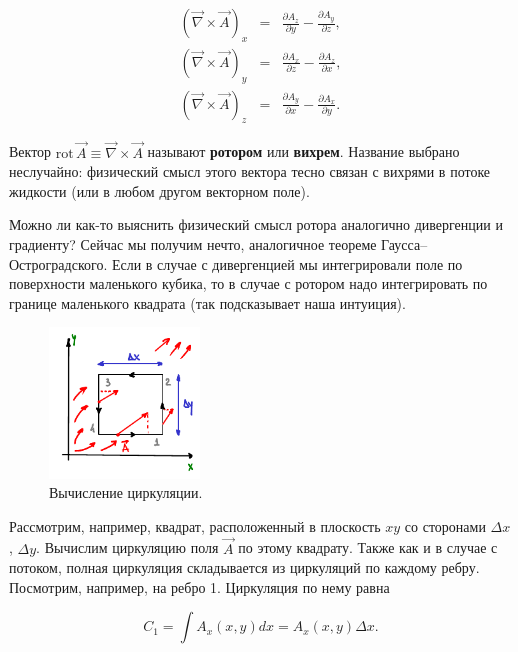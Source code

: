 \documentclass[12pt,a4paper]{article}
\numberwithin{equation}{section}
\numberwithin{equation}{section}
\newcommand{\nn}{\nonumber}
\newcommand{\pt}{\partial}
\newcommand{\rot}{\mathrm{rot}\,}
\newcommand{\vn}{\vec{\nabla}}
\begin{document}
\begin{eqnarray}
  \label{eq:def_curl}
  \nn
  (\vec{\nabla} \times \vec{A})_x &=& \frac{\pt A_z}{\pt y} -  \frac{\pt
    A_y}{\pt z},\\
  (\vec{\nabla} \times \vec{A})_y &=& \frac{\pt A_x}{\pt z} -  \frac{\pt
    A_z}{\pt x},\\
  \nn
  (\vec{\nabla} \times \vec{A})_z &=& \frac{\pt A_y}{\pt x} -  \frac{\pt
    A_x}{\pt y}.
\end{eqnarray}

Вектор $\rot \vec{A} \equiv \vn \times \vec{A}$ называют
\textbf{ротором} или \textbf{вихрем}. Название выбрано неслучайно:
физический смысл этого вектора тесно связан с вихрями в потоке
жидкости (или в любом другом векторном поле).

Можно ли как-то выяснить физический смысл ротора аналогично
дивергенции и градиенту? Сейчас мы получим нечто, аналогичное теореме
Гаусса--Остроградского. Если в случае с дивергенцией мы интегрировали
поле по поверхности маленького кубика, то в случае с ротором надо
интегрировать по границе маленького квадрата (так подсказывает наша
интуиция).

\begin{figure}
  \vspace{-0.5cm}
  \begin{center}
    \includegraphics[width=4cm,height=4cm]{stokes.pdf}
  \end{center}
  \vspace{-0.7cm}
  \caption{Вычисление циркуляции.}
  \label{fig:stokes}
  \vspace{2cm}
\end{figure}

Рассмотрим, например, квадрат, расположенный в плоскость $xy$ со
сторонами $\Delta x$, $\Delta y$. Вычислим циркуляцию поля $\vec{A}$
по этому квадрату. Также как и в случае с потоком, полная циркуляция
складывается из циркуляций по каждому ребру. Посмотрим, например, на
ребро 1. Циркуляция по нему равна

\begin{equation}
  \label{eq:theorem_curl_1}
  C_1 = \int A_x (x,y) d x = A_x (x,y) \Delta x. 
\end{equation}
\end{document}
